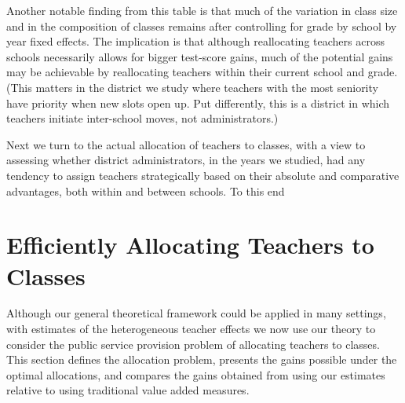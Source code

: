\documentclass[12pt]{article}
\theoremstyle{definition}
\theoremstyle{definition}
\theoremstyle{definition}
\theoremstyle{definition}
\begin{document}
Another notable finding from this table is that much of the variation in class size and in the composition of classes remains after controlling for grade by school by year fixed effects. The implication is that although reallocating teachers across schools necessarily allows for bigger test-score gains, much of the potential gains may be achievable by reallocating teachers within their current school and grade. (This matters in the district we study where teachers with the most seniority have priority when new slots open up. Put differently, this is a district in which teachers initiate inter-school moves, not administrators.)


Next we turn to the actual allocation of teachers to classes, with a view to assessing whether district administrators, in the years we studied, had any tendency to assign teachers strategically based on their absolute and comparative advantages, both within and between schools. To this end 



\section{Efficiently Allocating Teachers to Classes}

Although our general theoretical framework could be applied in many settings, with estimates of the heterogeneous teacher effects we now use our theory to consider the public service provision problem of allocating teachers to classes. This section defines the allocation problem, presents the gains possible under the optimal allocations, and compares the gains obtained from using our estimates relative to using traditional value added measures.
\end{document}
